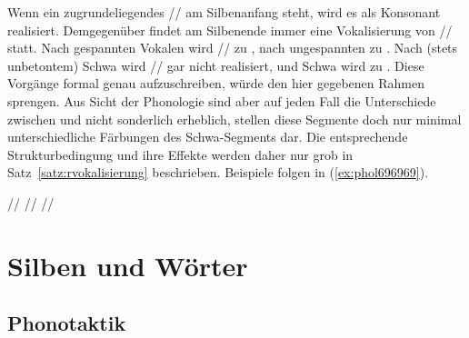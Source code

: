 Wenn ein zugrundeliegendes // am Silbenanfang steht, wird es als Konsonant \textipa{[K]} realisiert.
Demgegenüber findet am Silbenende immer eine Vokalisierung von // statt.
Nach gespannten Vokalen wird // zu \textipa{[5]}, nach ungespannten zu \textipa{[@]}.
Nach (stets unbetontem) Schwa wird // gar nicht realisiert, und Schwa wird zu \textipa{[5]}.
Diese Vorgänge formal genau aufzuschreiben, würde den hier gegebenen Rahmen sprengen.
Aus Sicht der Phonologie sind aber auf jeden Fall die Unterschiede zwischen \textipa{[@]} und \textipa{[5]} nicht sonderlich erheblich, stellen diese Segmente doch nur minimal unterschiedliche Färbungen des Schwa-Segments dar.
Die entsprechende Strukturbedingung und ihre Effekte werden daher nur grob in Satz~\ref{satz:rvokalisierung} beschrieben.
Beispiele folgen in (\ref{ex:phol696969}).


\begin{exe}
  \ex \label{ex:phol696969}
  \begin{xlist}
  	\ex // \phopro \textipa{[kl\t{aE}.n5]}
  	\ex // \phopro \textipa{[t\t{i5}]}
  	\ex // \phopro \textipa{[b\t{I@}.k@]}
  \end{xlist}
\end{exe}




\section{Silben und Wörter}

\label{sec:silbenundwoerter}

\subsection{Phonotaktik}

